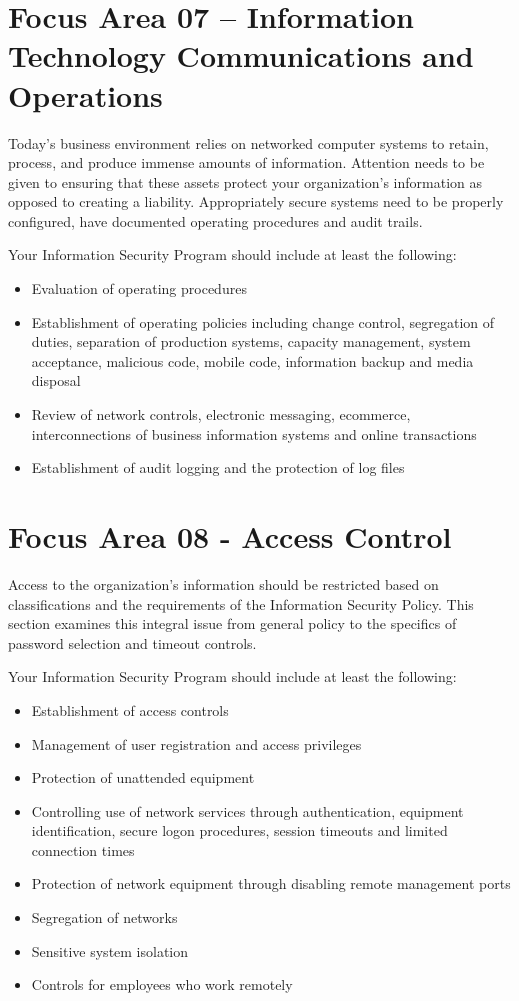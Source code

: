 \documentclass{needs}
\begin{document}
		
		\fSixTable
		
	\section{Focus Area 07 – Information Technology Communications and Operations}
		
		Today’s business environment relies on networked computer systems to retain, process, and produce immense amounts of information.   Attention needs to be given to ensuring that these assets protect your organization’s information as opposed to creating a liability.  Appropriately secure systems need to be properly configured, have documented operating procedures and audit trails.  
		
		Your Information Security Program should include at least the following: 
		\begin{itemize}
			\item Evaluation of operating procedures
			\item Establishment of operating policies including change control, segregation of duties, separation of production systems, capacity management, system acceptance, malicious code, mobile code, information backup and media disposal
			\item Review of network controls, electronic messaging, ecommerce, interconnections of business information systems and online transactions
			\item Establishment of audit logging and the protection of log files
		\end{itemize}
		
		
		\fSevenTable
	
	\section{Focus Area 08 - Access Control}
	
		Access to the organization’s information should be restricted based on classifications and the requirements of the Information Security Policy.  This section examines this integral issue from general policy to the specifics of password selection and timeout controls.
		
		Your Information Security Program should include at least the following: 
		\begin{itemize}
			\item Establishment of access controls
			\item Management of user registration and access privileges
			\item Protection of unattended equipment
			\item Controlling use of network services through authentication, equipment identification, secure logon procedures, session timeouts and limited connection times
			\item Protection of network equipment through disabling remote management ports
			\item Segregation of networks
			\item Sensitive system isolation
			\item Controls for employees who work remotely
		\end{itemize}		
		
\end{document}
